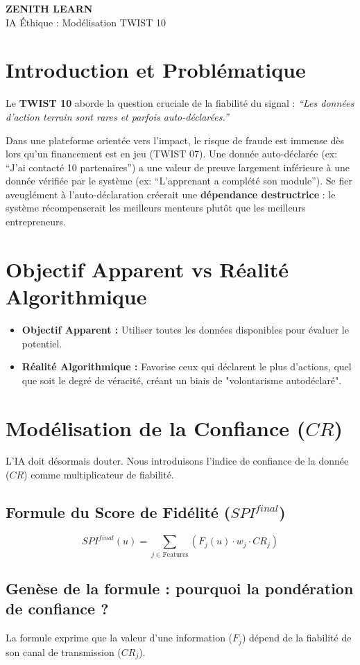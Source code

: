 \documentclass[11pt,a4paper]{article}
\newcommand{\makebrandtitle}{
    \begin{tcolorbox}[enhanced, colback=BrandDark, colframe=BrandPrimary, arc=10pt, boxrule=2pt, halign=center]
        \vspace{0.3cm}
        {\Huge \bfseries \color{white} ZENITH LEARN} \\
        \vspace{0.2cm}
        {\Large \color{BrandPrimary} IA Éthique : Modélisation TWIST 10} \\
        \vspace{0.3cm}
    \end{tcolorbox}
    \vspace{0.5cm}
}
\begin{document}
\makebrandtitle

\section{Introduction et Problématique}
Le \textbf{TWIST 10} aborde la question cruciale de la fiabilité du signal : \textit{``Les données d'action terrain sont rares et parfois auto-déclarées.''} 

Dans une plateforme orientée vers l'impact, le risque de fraude est immense dès lors qu'un financement est en jeu (TWIST 07). Une donnée auto-déclarée (ex: ``J'ai contacté 10 partenaires'') a une valeur de preuve largement inférieure à une donnée vérifiée par le système (ex: ``L'apprenant a complété son module''). Se fier aveuglément à l'auto-déclaration créerait une \textbf{dépendance destructrice} : le système récompenserait les meilleurs menteurs plutôt que les meilleurs entrepreneurs.

\section{Objectif Apparent vs Réalité Algorithmique}
\begin{itemize}
    \item \textbf{Objectif Apparent :} Utiliser toutes les données disponibles pour évaluer le potentiel.
    \item \textbf{Réalité Algorithmique :} Favorise ceux qui déclarent le plus d'actions, quel que soit le degré de véracité, créant un biais de "volontarisme autodéclaré".
\end{itemize}

\section{Modélisation de la Confiance ($CR$)}
L'IA doit désormais douter. Nous introduisons l'indice de confiance de la donnée ($CR$) comme multiplicateur de fiabilité.

\subsection{Formule du Score de Fidélité ($SPI^{final}$)}
\begin{equation}
SPI^{final}(u) = \sum_{j \in \text{Features}} (F_j(u) \cdot w_j \cdot CR_j)
\end{equation}

\subsection{Genèse de la formule : pourquoi la pondération de confiance ?}
La formule exprime que la valeur d'une information ($F_j$) dépend de la fiabilité de son canal de transmission ($CR_j$). 
\end{document}
